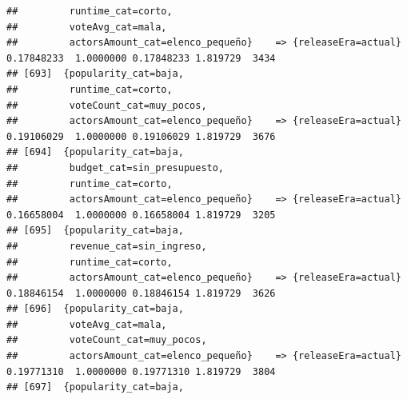 \documentclass[
]{article}
\begin{document}
\begin{verbatim}
##         runtime_cat=corto,                                                                                                      
##         voteAvg_cat=mala,                                                                                                       
##         actorsAmount_cat=elenco_pequeño}    => {releaseEra=actual}               0.17848233  1.0000000 0.17848233 1.819729  3434
## [693]  {popularity_cat=baja,                                                                                                    
##         runtime_cat=corto,                                                                                                      
##         voteCount_cat=muy_pocos,                                                                                                
##         actorsAmount_cat=elenco_pequeño}    => {releaseEra=actual}               0.19106029  1.0000000 0.19106029 1.819729  3676
## [694]  {popularity_cat=baja,                                                                                                    
##         budget_cat=sin_presupuesto,                                                                                             
##         runtime_cat=corto,                                                                                                      
##         actorsAmount_cat=elenco_pequeño}    => {releaseEra=actual}               0.16658004  1.0000000 0.16658004 1.819729  3205
## [695]  {popularity_cat=baja,                                                                                                    
##         revenue_cat=sin_ingreso,                                                                                                
##         runtime_cat=corto,                                                                                                      
##         actorsAmount_cat=elenco_pequeño}    => {releaseEra=actual}               0.18846154  1.0000000 0.18846154 1.819729  3626
## [696]  {popularity_cat=baja,                                                                                                    
##         voteAvg_cat=mala,                                                                                                       
##         voteCount_cat=muy_pocos,                                                                                                
##         actorsAmount_cat=elenco_pequeño}    => {releaseEra=actual}               0.19771310  1.0000000 0.19771310 1.819729  3804
## [697]  {popularity_cat=baja,                                                                                                    

\end{verbatim}
\end{document}
